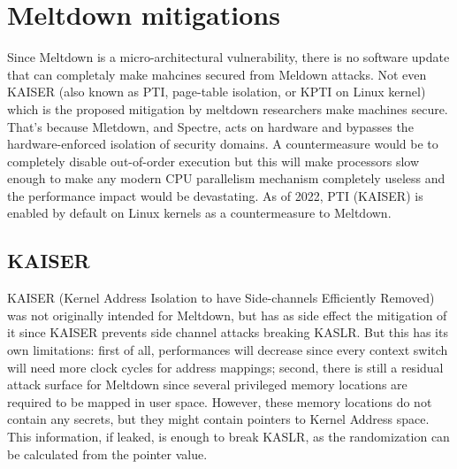 \section{Meltdown mitigations}
Since Meltdown is a micro-architectural vulnerability, there is no software update that can completaly make mahcines secured from Meldown attacks.
Not even KAISER (also known as PTI, page-table isolation, or KPTI on Linux kernel) which is the proposed
mitigation by meltdown researchers make machines secure. That's because
Mletdown, and Spectre, acts on hardware and bypasses the hardware-enforced isolation of security domains.
A countermeasure would be to completely disable out-of-order execution but this will make processors slow enough to make any modern CPU parallelism mechanism
completely useless and the performance impact would be devastating. As of 2022, PTI (KAISER) is enabled by default on Linux kernels as a countermeasure to Meltdown.

\subsection{KAISER}
KAISER (Kernel Address Isolation to have Side-channels Efficiently Removed) was not originally intended for Meltdown, but has as side effect the mitigation of it
since KAISER prevents side channel attacks breaking KASLR. But this has its own limitations: first of all, performances will decrease since every context switch will
need more clock cycles for address mappings; second, there is still a residual attack surface for Meltdown since several privileged memory locations are required
to be mapped in user space. However, these memory locations do not contain any secrets, but they might contain pointers to Kernel Address space. This information, if leaked,
is enough to break KASLR, as the randomization can be calculated from the pointer value.
